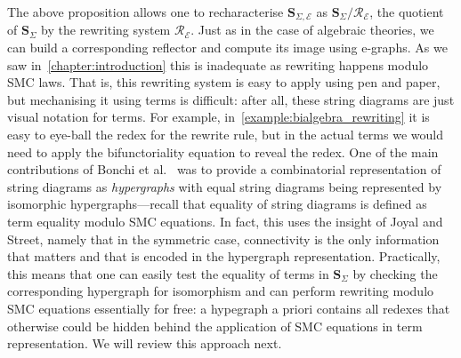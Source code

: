 The above proposition allows one to recharacterise $\mathbf{S}_{\Sigma, \mathcal{E}}$ as $\mathbf{S}_{\Sigma}/\mathcal{R}_{\mathcal{E}}$, the quotient of $\mathbf{S}_{\Sigma}$ by the rewriting system $\mathcal{R}_{\mathcal{E}}$.
Just as in the case of algebraic theories, we can build a corresponding reflector and compute its image using e-graphs.
As we saw in~\cref{chapter:introduction} this is inadequate as rewriting happens modulo SMC laws.
That is, this rewriting system is easy to apply using pen and paper, but mechanising it using terms is difficult: after all, these string diagrams are just visual notation for terms.
For example, in~\cref{example:bialgebra_rewriting} it is easy to eye-ball the redex for the rewrite rule, but in the actual terms we would need to apply the bifunctoriality equation to reveal the redex.
One of the main contributions of Bonchi et al.~\cite{bonchi_string_2022-1, bonchi_string_2022-2} was to provide a combinatorial representation of string diagrams as \emph{hypergraphs} with equal string diagrams being represented by isomorphic hypergraphs---recall that equality of string diagrams is defined as term equality modulo SMC equations.
In fact, this uses the insight of Joyal and Street, namely that in the symmetric case, connectivity is the only information that matters and that is encoded in the hypergraph representation.
Practically, this means that one can easily test the equality of terms in $\mathbf{S}_{\Sigma}$ by checking the corresponding hypergraph for isomorphism and can perform rewriting modulo SMC equations essentially for free: a hypegraph a priori contains all redexes that otherwise could be hidden behind the application of SMC equations in term representation.
We will review this approach next.

